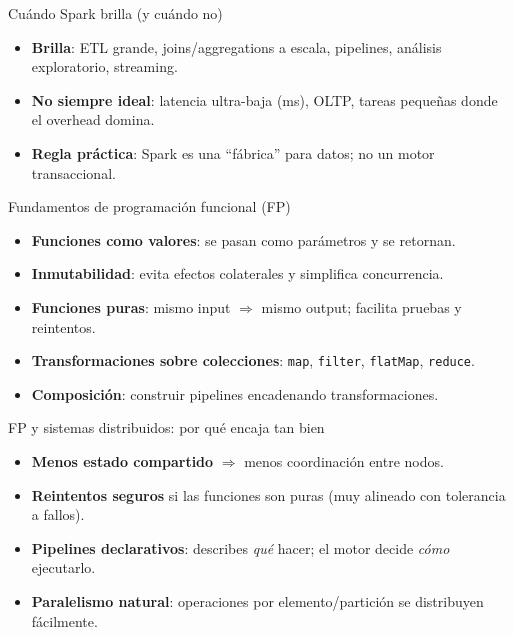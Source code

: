 \documentclass{beamer}
\begin{document}
\begin{frame}{Cuándo Spark brilla (y cuándo no)}
\begin{itemize}
  \item \textbf{Brilla}: ETL grande, joins/aggregations a escala, pipelines, análisis exploratorio, streaming.
  \item \textbf{No siempre ideal}: latencia ultra-baja (ms), OLTP, tareas pequeñas donde el overhead domina.
  \item \textbf{Regla práctica}: Spark es una “fábrica” para datos; no un motor transaccional.
\end{itemize}
\end{frame}



\begin{frame}{Fundamentos de programación funcional (FP)}
\begin{itemize}
  \item \textbf{Funciones como valores}: se pasan como parámetros y se retornan.
  \item \textbf{Inmutabilidad}: evita efectos colaterales y simplifica concurrencia.
  \item \textbf{Funciones puras}: mismo input \(\Rightarrow\) mismo output; facilita pruebas y reintentos.
  \item \textbf{Transformaciones sobre colecciones}: \texttt{map}, \texttt{filter}, \texttt{flatMap}, \texttt{reduce}.
  \item \textbf{Composición}: construir pipelines encadenando transformaciones.
\end{itemize}
\end{frame}

\begin{frame}{FP y sistemas distribuidos: por qué encaja tan bien}
\begin{itemize}
  \item \textbf{Menos estado compartido} \(\Rightarrow\) menos coordinación entre nodos.
  \item \textbf{Reintentos seguros} si las funciones son puras (muy alineado con tolerancia a fallos).
  \item \textbf{Pipelines declarativos}: describes \emph{qué} hacer; el motor decide \emph{cómo} ejecutarlo.
  \item \textbf{Paralelismo natural}: operaciones por elemento/partición se distribuyen fácilmente.
\end{itemize}
\end{frame}
\end{document}
